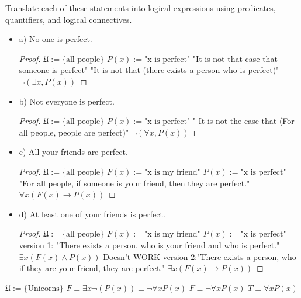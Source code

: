 \begin{exmp}
Translate each of these statements into logical expressions
using predicates, quantifiers, and logical connectives.
\begin{itemize}
\item a) No one is perfect.
\begin{proof}
$\mathfrak{U}:=\{\text{all people}\}$ 
\newline
$P(x):=\text{"x is perfect"}$
\newline
"It is not that case that someone is perfect"
\newline
"It is not that (there exists a person who is perfect)"
\newline
$\lnot(\exists x, P(x)) $
\end{proof}
\item b) Not everyone is perfect.
\begin{proof}
$\mathfrak{U}:=\{\text{all people}\}$ 
\newline
$P(x):=\text{"x is perfect"}$
\newline
" It is not the case that (For all people, people are perfect)"
\newline
$\lnot(\forall x, P(x)) $
\end{proof}
\item c) All your friends are perfect.
\begin{proof}
$\mathfrak{U}:=\{\text{all people}\}$ 
\newline
$F(x):=\text{"x is my friend"}$
\newline
$P(x):=\text{"x is perfect"}$
\newline
"For all people, if someone is your friend, then they are perfect."
\newline
$\forall x ( F(x) \to P(x) ) $
\end{proof}
\item d) At least one of your friends is perfect.
\begin{proof}
$\mathfrak{U}:=\{\text{all people}\}$ 
\newline
$F(x):=\text{"x is my friend"}$
\newline
$P(x):=\text{"x is perfect"}$
\newline
version 1:
\newline
"There exists a person, who is your friend and who is perfect."
\newline
$\exists x (F(x) \land P(x)) $
\newline
Doesn't WORK
\newline
version 2:"There exists a person, who if they are your friend, they are perfect."
\newline
$\exists x (F(x) \to P(x)) $
\end{proof}
\end{itemize}
\end{exmp}
$\mathfrak{U}:=\{\text{Unicorns}\}$
\newline
$F\equiv\exists x \lnot (P(x))\equiv \lnot \forall x P(x)$
\newline
$F\equiv\lnot \forall x P(x)$
\newline
$T\equiv \forall x P(x)$


